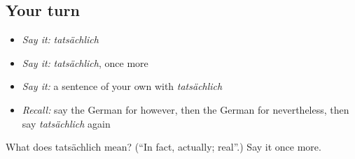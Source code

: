 \subsection*{Your turn}
\begin{itemize}
\raggedright
  \item \emph{Say it:} \emph{tatsächlich}
  \item \emph{Say it:} \emph{tatsächlich}, once more
  \item \emph{Say it:} a sentence of your own with \emph{tatsächlich}
  \item \emph{Recall:} say the German for however, then the German for nevertheless, then say \emph{tatsächlich} again
\end{itemize}

\begin{tcolorbox}[breakable,colback=teal!4,colframe=teal!35!black,title={Before you move on}]
What does tatsächlich mean? (\textquotedblleft{}In fact, actually; real\textquotedblright{}.) Say it once more.
\end{tcolorbox}
